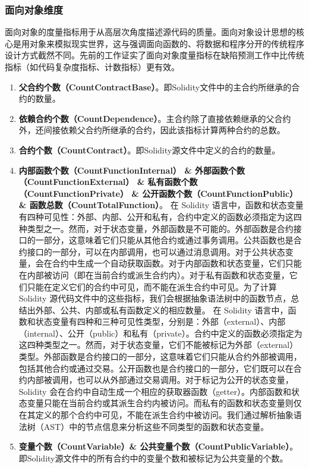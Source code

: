 \subsubsection{面向对象维度}
面向对象的度量指标用于从高层次角度描述源代码的质量。面向对象设计思想的核心是用对象来模拟现实世界，这与强调面向函数的、将数据和程序分开的传统程序设计方式截然不同。先前的工作\cite{martin1994oodesign,basili1996validation,KHAN20071}证实了面向对象度量指标在缺陷预测工作中比传统指标（如代码复杂度指标、计数指标）更有效。
\begin{enumerate}[label=\Alph*., align=left, leftmargin=*]
    \item \textbf{父合约个数（CountContractBase）}。即Solidity文件中的主合约所继承的合约的数量。

    \item \textbf{依赖合约个数（CountDependence）}。主合约除了直接依赖继承的父合约外，还间接依赖父合约所继承的合约，因此该指标计算两种合约的总数。

    \item \textbf{合约个数（CountContract）}。即Solidity源文件中定义的合约的数量。

    \item \textbf{内部函数个数（CountFunctionInternal） \& 外部函数个数（CountFunctionExternal） \& 私有函数个数（CountFunctionPrivate） \& 公开函数个数（CountFunctionPublic） \& 函数总数（CountTotalFunction）}。 在 Solidity 语言中，函数和状态变量有四种可见性：外部、内部、公开和私有，合约中定义的函数必须指定为这四种类型之一。然而，对于状态变量，外部函数是不可能的。外部函数是合约接口的一部分，这意味着它们只能从其他合约或通过事务调用。公共函数也是合约接口的一部分，可以在内部调用，也可以通过消息调用。对于公共状态变量，会在合约中生成一个自动获取函数。对于内部函数和状态变量，它们只能在内部被访问（即在当前合约或派生合约内）。对于私有函数和状态变量，它们只能在定义它们的合约中可见，而不能在派生合约中可见。为了计算 Solidity 源代码文件中的这些指标，我们会根据抽象语法树中的函数节点，总结出外部、公共、内部或私有函数定义的相应数量。
    在 Solidity 语言中，函数和状态变量有四种和三种可见性类型，分别是：外部（external）、内部（internal）、公开（public）和私有（private）。合约中定义的函数必须指定为这四种类型之一。然而，对于状态变量，它们不能被标记为外部（external）类型。外部函数是合约接口的一部分，这意味着它们只能从合约外部被调用，包括其他合约或通过交易。公开函数也是合约接口的一部分，它们既可以在合约内部被调用，也可以从外部通过交易调用。对于标记为公开的状态变量，Solidity 会在合约中自动生成一个相应的获取器函数（getter）。内部函数和状态变量只能在当前合约或其派生合约内被访问。而私有的函数和状态变量则仅在其定义的那个合约中可见，不能在派生合约中被访问。我们通过解析抽象语法树（AST）中的节点信息来分析这些不同类型的函数和状态变量。
    \item \textbf{变量个数（CountVariable）\& 公共变量个数（CountPublicVariable）}。即Solidity源文件中的所有合约中的变量个数和被标记为公共变量的个数。
\end{enumerate}
